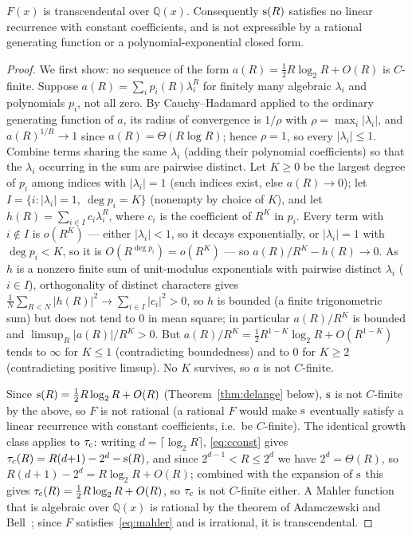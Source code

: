 \begin{corollary}\label{cor:transcend}
	$F(x)$ is transcendental over $\mathbb{Q}(x)$. Consequently $\mathrm{s}(R)$
	satisfies no linear recurrence with constant coefficients, and is not
	expressible by a rational generating function or a polynomial-exponential
	closed form.
\end{corollary}

\begin{proof}
	We first show: no sequence of the form $a(R) = \tfrac{1}{2}R\log_2 R +
	O(R)$ is $C$-finite. Suppose $a(R) = \sum_i p_i(R)\lambda_i^R$ for
	finitely many algebraic $\lambda_i$ and polynomials $p_i$, not all zero.
	By Cauchy--Hadamard applied to the ordinary generating function of $a$,
	its radius of convergence is $1/\rho$ with $\rho = \max_i |\lambda_i|$,
	and $a(R)^{1/R} \to 1$ since $a(R) = \Theta(R\log R)$; hence $\rho = 1$,
	so every $|\lambda_i| \le 1$. Combine terms sharing the same $\lambda_i$
	(adding their polynomial coefficients) so that the $\lambda_i$ occurring
	in the sum are pairwise distinct. Let $K \ge 0$ be the largest degree of
	$p_i$ among indices with $|\lambda_i| = 1$ (such indices exist, else
	$a(R) \to 0$); let $I = \{i : |\lambda_i| = 1,\ \deg p_i = K\}$
	(nonempty by choice of $K$), and let $h(R) = \sum_{i \in I} c_i
	\lambda_i^R$, where $c_i$ is the coefficient of $R^K$ in $p_i$. Every
	term with $i \notin I$ is $o(R^K)$ --- either $|\lambda_i| < 1$, so it
	decays exponentially, or $|\lambda_i| = 1$ with $\deg p_i < K$, so it is
	$O(R^{\deg p_i}) = o(R^K)$ --- so $a(R)/R^K - h(R) \to 0$. As $h$ is a
	nonzero finite sum of unit-modulus exponentials with pairwise distinct
	$\lambda_i$ ($i \in I$), orthogonality of distinct characters
	gives $\frac{1}{N}\sum_{R<N} |h(R)|^2 \to \sum_{i \in I}
	|c_i|^2 > 0$, so $h$ is bounded (a finite trigonometric
	sum) but does not tend to $0$ in mean square; in particular $a(R)/R^K$
	is bounded and $\limsup_R |a(R)|/R^K > 0$. But $a(R)/R^K =
	\tfrac{1}{2}R^{1-K}\log_2 R + O(R^{1-K})$ tends to $\infty$ for $K \le 1$
	(contradicting boundedness) and to $0$ for $K \ge 2$ (contradicting
	positive limsup). No $K$ survives, so $a$ is not $C$-finite.

	Since $\mathrm{s}(R) = \tfrac{1}{2}R\log_2 R + O(R)$ (Theorem~\ref{thm:delange}
	below), $\mathrm{s}$ is not $C$-finite by the above, so $F$ is not rational
	(a rational $F$ would make $\mathrm{s}$ eventually satisfy a linear recurrence
	with constant coefficients, i.e.\ be $C$-finite). The identical growth
	class applies to $\tau_{\mathrm{c}}$: writing $d = \lceil \log_2 R \rceil$,
	\eqref{eq:cconst} gives $\tau_{\mathrm{c}}(R) = R(d{+}1) - 2^d - \mathrm{s}(R)$, and
	since $2^{d-1} < R \le 2^d$ we have $2^d = \Theta(R)$, so
	$R(d{+}1) - 2^d = R\log_2 R + O(R)$; combined with the expansion of
	$\mathrm{s}$ this gives $\tau_{\mathrm{c}}(R) = \tfrac{1}{2}R\log_2 R + O(R)$, so
	$\tau_{\mathrm{c}}$ is not $C$-finite either. A Mahler function that is algebraic
	over $\mathbb{Q}(x)$ is rational by the theorem of Adamczewski and
	Bell~\cite{adamczewski2017problem}; since $F$ satisfies~\eqref{eq:mahler}
	and is irrational, it is transcendental.
\end{proof}

